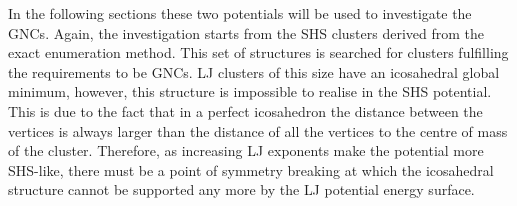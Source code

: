 In the following sections these two potentials will be used to investigate the
\acp{GNC}. Again, the investigation starts from the \ac{SHS} clusters derived
from the exact enumeration
method.\autocite{Hoy_Structuredynamicsmodel_2015,Holmes-Cerfon_EnumeratingRigidSphere_2016,Holmes-Cerfon_StickySphereClusters_2017}
This set of structures is searched for clusters fulfilling the requirements to
be \acp{GNC}. \ac{LJ} clusters of this size have an icosahedral global minimum,
however, this structure is impossible to realise in the \ac{SHS} potential. This
is due to the fact that in a perfect icosahedron the distance between the
vertices is always larger than the distance of all the vertices to the centre of
mass of the cluster. Therefore, as increasing \ac{LJ} exponents make the
potential more \ac{SHS}-like, there must be a point of symmetry breaking at which the icosahedral
structure cannot be supported any more by the \ac{LJ} potential energy surface.



